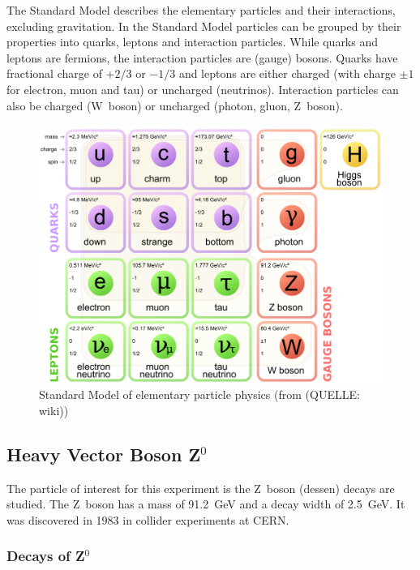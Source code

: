 \documentclass[11pt, a4paper]{article}
\numberwithin{equation}{section}
\newcommand{\korr}[1]{{\color{red}(#1)}}
\begin{document}
The Standard Model describes the elementary particles and their interactions, excluding gravitation.
In the Standard Model particles can be grouped by their properties into quarks, leptons and interaction particles.
While quarks and leptons are fermions, the interaction particles are (gauge) bosons.
Quarks have fractional charge of $+2/3$ or $-1/3$ and leptons are either charged (with charge $\pm1$ for electron, muon and tau) or uncharged (neutrinos).
Interaction particles can also be charged (W~boson) or uncharged (photon, gluon, Z~boson).
\begin{figure}[h]
	\centering
	\includegraphics[width=.8\textwidth]{./figures/theory/standardmodel}
	\caption{Standard Model of elementary particle physics (from \korr{QUELLE: wiki})}
	\label{fig:standard_model}
\end{figure}

\subsection{Heavy Vector Boson Z$^0$}

The particle of interest for this experiment is the Z~boson \korr{dessen} decays are studied.
The Z~boson has a mass of \SI{91.2}{GeV} and a decay width of \SI{2.5}{GeV}.
It was discovered in 1983 in collider experiments at CERN.

\subsubsection{Decays of Z$^0$}
\end{document}
